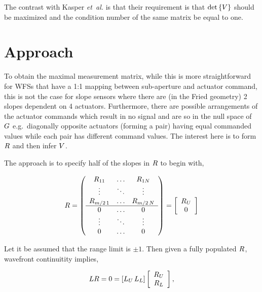 \documentclass[a4paper]{article}
\begin{document}
The contrast with Kasper {\it et~al.} is that their requirement is that
$\mbox{det}\left\{\mathnormal{V}\right\}$ should be maximized and the condition
number of the same matrix be equal to one.

\section{Approach}

To obtain the maximal measurement matrix, while this is more straightforward
for WFSs that have a 1:1 mapping between sub-aperture and actuator command,
this is not the case for slope sensors where there are (in the Fried geometry)
2 slopes dependent on 4 actuators. Furthermore, there are possible
arrangements of the actuator commands which result in no signal and are so in
the null space of $\mathnormal{G}$ e.g.~diagonally opposite actuators (forming a
pair) having equal commanded values while each pair has different command
values. The interest here is to form $\mathnormal{R}$ and then infer $\mathnormal{V}$.

The approach is to specify half of the slopes in $\mathnormal{R}$ to begin with,

\begin{displaymath} 
\mathnormal{R} = \left(
   \begin{array}{ccc} 
      R_{11} & \ldots & R_{1N} \\ 
      \vdots & \ddots & \vdots \\ 
      R_{m/2\,1} & \ldots & R_{m/2\,N}  \\\hline
      0 & \ldots & 0 \\ 
      \vdots & \ddots & \vdots \\ 
      0 & \ldots & 0 
   \end{array} \right) = \left[
   \begin{array}{c} 
      \mathnormal{R}_U \\ 0%
   \end{array} \right]
\end{displaymath} 

Let it be assumed that the range limit is $\pm1$. Then given a fully populated
$\mathnormal{R}$, wavefront continuitity implies,

\begin{equation}
   \mathnormal{L}\mathnormal{R}=0=\left[
      \mathnormal{L}_U\,\mathnormal{L}_L
   \right]\left[
   \begin{array}{c} 
      \mathnormal{R}_U \\ \mathnormal{R}_L
   \end{array} \right],
\end{equation}
\end{document}
